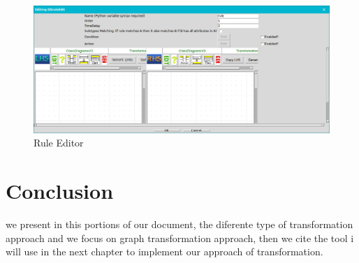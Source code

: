 \begin{figure}[th]
	\centering
 	\includegraphics[scale=0.38]{ch3/img/ruleEditor}
	\caption{\label{fig:Rule Editor}Rule Editor}
\end{figure} 

\section{Conclusion}
we present in this portions of our document, the diferente type of transformation approach 
and we focus on graph transformation approach, then we cite the tool i will use in the next chapter to implement 
our approach of transformation.
 